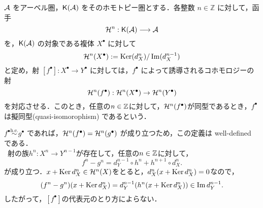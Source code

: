 \begin{defn}\cite[p.301]{KS06}
${\mathcal A}$ をアーベル圏，$\mathsf{K}({\mathcal A})$ をそのホモトピー圏とする．各整数 $n \in \mathbb{Z}$ に対して，函手
\[
{\mathcal H}^n: \mathsf{K}({\mathcal A}) \longrightarrow {\mathcal A}
\]
を，$\mathsf{K}({\mathcal A})$ の対象である複体 $X^\bullet$ に対して
\[
{\mathcal H}^n(X^\bullet) := \operatorname{Ker}(d_X^n)/\Im(d_X^{n-1})
\]
と定め，射 $[f^\bullet]: X^\bullet \to Y^\bullet$ に対しては，$f^\bullet$ によって誘導されるコホモロジーの射
\[
{\mathcal H}^n(f^\bullet): {\mathcal H}^n(X^\bullet) \to {\mathcal H}^n(Y^\bullet)
\]
を対応させる．このとき，任意の$n\in{\mathbb Z}$に対して，${\mathcal H}^n(f^\bullet)$が同型であるとき，$f^\bullet$は擬同型(quasi-isomorophism) であるという．

$f^\bullet \overset{\mathrm{h.e.}}{\sim} g^\bullet$ であれば，${\mathcal H}^n(f^\bullet) = {\mathcal H}^n(g^\bullet)$ が成り立つため，この定義は well-defined である．\\
\because\ 射の族$h^n\colon X^n\to Y^{n-1}$が存在して，任意の$n\in{\mathbb Z}$に対して，
\[
f^n - g^n = d_Y^{n-1} \circ h^n + h^{n+1} \circ d_X^n.
\]
が成り立つ．$x + \operatorname{Ker} d_X^{n} \in {\mathcal H}^n(X)$をとると，$d_X^n(x + \operatorname{Ker} d_X^{n}) = 0$なので，
\[
	(f^n - g^n)(x + \operatorname{Ker} d_X^{n}) = d_Y^{n-1} (h^n(x + \operatorname{Ker} d_X^n)) \in \Im d_Y^{n-1}. 
\]
したがって，$[f^\bullet]$の代表元のとり方によらない．
\end{defn}

